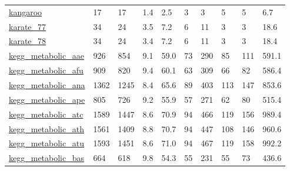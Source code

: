 \begin{longtable}{llllllllll}
 \href{http://konect.cc/networks/moreno_kangaroo}{kangaroo}                                                                 & 17         & 17    & 1.4    & 2.5    & 3     & 3      & 5      & 5      & 6.7     \\
 \href{http://tuvalu.santafe.edu/~aaronc/data/}{karate\_77}                                                                  & 34         & 24    & 3.5    & 7.2    & 6     & 11     & 3      & 3      & 18.6    \\
 \href{http://tuvalu.santafe.edu/~aaronc/data/}{karate\_78}                                                                  & 34         & 24    & 3.4    & 7.2    & 6     & 11     & 3      & 3      & 18.4    \\
 \href{http://santafe.edu/~aaronc/data/kegg2006_metabolic.zip}{kegg\_metabolic\_aae}                                          & 926        & 854   & 9.1    & 59.0   & 73    & 290    & 85     & 111    & 591.1   \\
 \href{http://santafe.edu/~aaronc/data/kegg2006_metabolic.zip}{kegg\_metabolic\_afu}                                          & 909        & 820   & 9.4    & 60.1   & 63    & 309    & 66     & 82     & 586.4   \\
 \href{http://santafe.edu/~aaronc/data/kegg2006_metabolic.zip}{kegg\_metabolic\_ana}                                          & 1362       & 1245  & 8.4    & 65.6   & 89    & 403    & 113    & 147    & 853.6   \\
 \href{http://santafe.edu/~aaronc/data/kegg2006_metabolic.zip}{kegg\_metabolic\_ape}                                          & 805        & 726   & 9.2    & 55.9   & 57    & 271    & 62     & 80     & 515.4   \\
 \href{http://santafe.edu/~aaronc/data/kegg2006_metabolic.zip}{kegg\_metabolic\_atc}                                          & 1589       & 1447  & 8.6    & 70.9   & 94    & 466    & 119    & 156    & 989.4   \\
 \href{http://santafe.edu/~aaronc/data/kegg2006_metabolic.zip}{kegg\_metabolic\_ath}                                          & 1561       & 1409  & 8.8    & 70.7   & 94    & 447    & 108    & 146    & 960.6   \\
 \href{http://santafe.edu/~aaronc/data/kegg2006_metabolic.zip}{kegg\_metabolic\_atu}                                          & 1593       & 1451  & 8.6    & 71.0   & 94    & 467    & 119    & 158    & 992.2   \\
 \href{http://santafe.edu/~aaronc/data/kegg2006_metabolic.zip}{kegg\_metabolic\_bas}                                          & 664        & 618   & 9.8    & 54.3   & 55    & 231    & 55     & 73     & 436.6   \\

\end{longtable}

